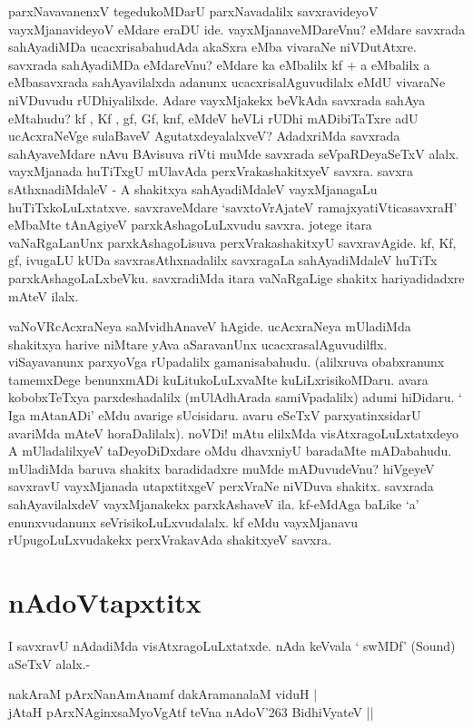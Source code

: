 parxNavavanenxV tegedukoMDarU parxNavadalilx savxravideyoV vayxMjanavideyoV eMdare eraDU ide. vayxMjanaveMDareVnu? eMdare savxrada sahAyadiMDa ucacxrisabahudAda akaSxra eMba vivaraNe niVDutAtxre. savxrada sahAyadiMDa eMdareVnu? eMdare ka eMbalilx kf + a eMbalilx a eMbasavxrada sahAyavilalxda adanunx ucacxrisalAguvudilalx eMdU vivaraNe niVDuvudu rUDhiyalilxde. Adare vayxMjakekx  beVkAda savxrada sahAya eMtahudu? kf , Kf , gf, Gf, knf, eMdeV heVLi rUDhi mADibiTaTxre adU ucAcxraNeVge sulaBaveV AgutatxdeyalalxveV? AdadxriMda savxrada sahAyaveMdare nAvu BAvisuva riVti muMde savxrada seVpaRDeyaSeTxV alalx. vayxMjanada huTiTxgU mUlavAda perxVrakashakitxyeV savxra. savxra sAthxnadiMdaleV - A shakitxya sahAyadiMdaleV vayxMjanagaLu huTiTxkoLuLxtatxve. savxraveMdare `savxtoVrAjateV ramajxyatiVticasavxraH'\label{17a} eMbaMte tAnAgiyeV parxkAshagoLuLxvudu savxra. jotege itara vaNaRgaLanUnx parxkAshagoLisuva perxVrakashakitxyU savxravAgide. kf, Kf, gf, ivugaLU kUDa savxrasAthxnadalilx savxragaLa sahAyadiMdaleV huTiTx parxkAshagoLaLxbeVku. savxradiMda itara vaNaRgaLige shakitx hariyadidadxre mAteV ilalx.

vaNoVRcAcxraNeya saMvidhAnaveV hAgide.  ucAcxraNeya mUladiMda shakitxya harive niMtare yAva aSaravanUnx ucacxrasalAguvudilflx. viSayavanunx parxyoVga rUpadalilx gamanisabahudu. (alilxruva obabxranunx tamemxDege benunxmADi kuLitukoLuLxvaMte kuLiLxrisikoMDaru. avara kobobxTeTxya parxdeshadalilx (mUlAdhArada samiVpadalilx) adumi hiDidaru. ` Iga mAtanADi' eMdu avarige sUcisidaru. avaru eSeTxV parxyatinxsidarU avariMda mAteV horaDalilalx).  noVDi! mAtu elilxMda visAtxragoLuLxtatxdeyo A mUladalilxyeV taDeyoDiDxdare oMdu dhavxniyU baradaMte mADabahudu. mUladiMda baruva shakitx baradidadxre muMde mADuvudeVnu? hiVgeyeV savxravU vayxMjanada utapxtitxgeV perxVraNe niVDuva shakitx. savxrada sahAyavilalxdeV vayxMjanakekx  parxkAshaveV ila. kf-eMdAga baLike `a' enunxvudanunx seVrisikoLuLxvudalalx. kf eMdu vayxMjanavu rUpugoLuLxvudakekx  perxVrakavAda shakitxyeV savxra.

\section*{nAdoVtapxtitx}

I savxravU nAdadiMda  visAtxragoLuLxtatxde. nAda keVvala ` swMDf' {(\eng Sound)} aSeTxV alalx.-

\begin{shloka}
nakAraM pArxNanAmAnamf dakAramanalaM viduH |\label{17}\\
jAtaH pArxNAginxsaMyoVgAtf teVna nAdoV\char'263 BidhiVyateV ||
\end{shloka}

